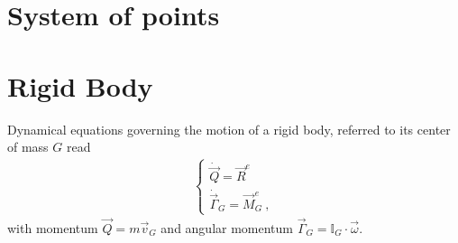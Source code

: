 \documentclass[letterpaper,10pt,english]{jupyterBook}
\begin{document}
\section{System of points}
\label{\detokenize{ch/lagrange-points:system-of-points}}\label{\detokenize{ch/lagrange-points:classical-mechanics-lagrange-points}}\label{\detokenize{ch/lagrange-points::doc}}
\sphinxAtStartPar
{}

\sphinxAtStartPar
{}

\sphinxAtStartPar
{}

\sphinxstepscope


\section{Rigid Body}
\label{\detokenize{ch/lagrange-rigid-body:rigid-body}}\label{\detokenize{ch/lagrange-rigid-body:classical-mechanics-lagrange-rigid}}\label{\detokenize{ch/lagrange-rigid-body::doc}}
\sphinxAtStartPar
{} Dynamical equations governing the motion of a rigid body, referred to its center of mass \(G\) read
\begin{equation*}
\begin{split}\begin{cases}
  \dot{\vec{Q}} = \vec{R}^{e} \\
  \dot{\vec{\Gamma}}_G = \vec{M}^e_G \ ,
\end{cases}\end{split}
\end{equation*}
\sphinxAtStartPar
with momentum \(\vec{Q} = m \vec{v}_G\) and angular momentum \(\vec{\Gamma}_G = \mathbb{I}_G \cdot \vec{\omega}\).
\end{document}
